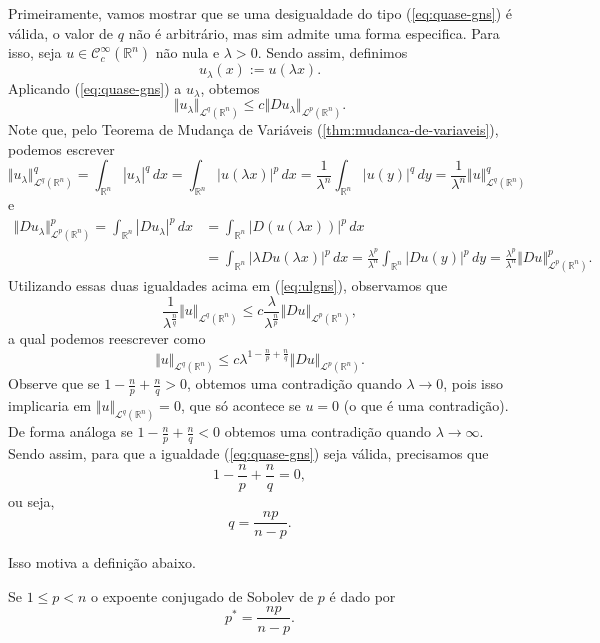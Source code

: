 \documentclass[a4paper, 11pt]{book}
\theoremstyle{definition}
\newcommand{\bR}{\mathbb{R}}
\newcommand{\cC}{\mathcal{C}}
\newcommand{\cL}{\mathcal{L}}
\begin{document}
Primeiramente, vamos mostrar que se uma desigualdade do tipo (\ref{eq:quase-gns}) é válida, o valor de $q$ não é arbitrário, mas sim admite uma forma especifica.
Para isso, seja $u \in \cC^\infty_c(\bR^n)$ não nula e $\lambda > 0$.
Sendo assim, definimos
\[
    u_\lambda(x) := u(\lambda x).
\]
Aplicando (\ref{eq:quase-gns}) a $u_\lambda$, obtemos
\begin{equation} \label{eq:ulgns}
    \Vert u_\lambda \Vert_{\cL^q(\bR^n)} \leqslant c \Vert Du_\lambda \Vert_{\cL^p(\bR^n)}.
\end{equation}
Note que, pelo Teorema de Mudança de Variáveis (\ref{thm:mudanca-de-variaveis}), podemos escrever
\[
    \Vert u_\lambda \Vert_{\cL^q(\bR^n)}^q = \int_{\bR^n} |u_\lambda|^q \,dx = \int_{\bR^n} |u(\lambda x)|^p \,dx = \frac{1}{\lambda^n} \int_{\bR^n} |u(y)|^q \,dy = \frac{1}{\lambda^n}\Vert u \Vert_{\cL^q(\bR^n)}^q
\]
e
\[
    \begin{aligned}
        \Vert Du_\lambda \Vert_{\cL^p(\bR^n)}^p = \int_{\bR^n} |Du_\lambda|^p \,dx &= \int_{\bR^n} |D(u(\lambda x))|^p \,dx \\
        &= \int_{\bR^n} |\lambda Du(\lambda x)|^p \,dx = \frac{\lambda^p}{\lambda^n} \int_{\bR^n} |Du(y)|^p \,dy = \frac{\lambda^p}{\lambda^n}\Vert Du \Vert_{\cL^p(\bR^n)}^p.
    \end{aligned}
\]
Utilizando essas duas igualdades acima em (\ref{eq:ulgns}), observamos que
\[
    \frac{1}{\lambda^{\frac{n}{q}}} \Vert u \Vert_{\cL^q(\bR^n)} \leqslant c \frac{\lambda}{\lambda^{\frac{n}{p}}}\Vert Du \Vert_{\cL^p(\bR^n)},
\]
a qual podemos reescrever como
\begin{equation}
    \Vert u \Vert_{\cL^q(\bR^n)} \leqslant c\lambda^{1 - \frac{n}{p}  + \frac{n}{q}}\Vert Du \Vert_{\cL^p(\bR^n)}.
\end{equation}
Observe que se $1 - \frac{n}{p} + \frac{n}{q} > 0$, obtemos uma contradição quando $\lambda \to 0$, pois isso implicaria em $\Vert u \Vert_{\cL^q(\bR^n)} = 0$,
que só acontece se $u = 0$ (o que é uma contradição).
De forma análoga se $1 - \frac{n}{p} + \frac{n}{q} < 0$ obtemos uma contradição quando $\lambda \to \infty$.
Sendo assim, para que a igualdade (\ref{eq:quase-gns}) seja válida, precisamos que
\[
    1 - \frac{n}{p} + \frac{n}{q} = 0,
\]
ou seja,
\[
    q = \frac{np}{n - p}.
\]

Isso motiva a definição abaixo.
\begin{dbox}
    Se $1 \leqslant p < n$ o expoente conjugado de Sobolev de $p$ é dado por
    \[
        p^* = \frac{np}{n - p}.
    \]
\end{dbox}
\end{document}
